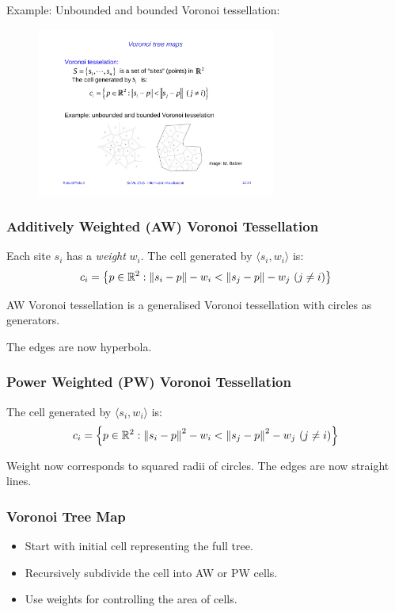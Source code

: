 Example: Unbounded and bounded Voronoi tessellation:
\begin{figure}[H]
\centering
\includegraphics[width=0.7\textwidth]{img/12_voronoi_tessellation}
\end{figure}

\subsubsection{Additively Weighted (AW) Voronoi Tessellation}
Each site $s_i$ has a \emph{weight} $w_i$. The cell generated by $\langle s_i, w_i\rangle$ is:
\begin{align*}
    c_i = \left\{
        p\in \mathbb{R}^2: \left\lVert s_i-p\right\rVert-w_i < \left\lVert s_j-p\right\rVert-w_j\ (j\neq i)
    \right\}
\end{align*}

AW Voronoi tessellation is a generalised  Voronoi tessellation with circles as generators.

The edges are now hyperbola.

\subsubsection{Power Weighted (PW) Voronoi Tessellation}

The cell generated by $\langle s_i, w_i\rangle$ is:
\begin{align*}
    c_i = \left\{
        p\in \mathbb{R}^2: \left\lVert s_i-p\right\rVert^2-w_i < \left\lVert s_j-p\right\rVert^2-w_j\ (j\neq i)
    \right\}
\end{align*}

Weight now corresponds to squared radii of circles. The edges are now straight lines.



\subsubsection{Voronoi Tree Map}
\begin{itemize}
\item Start with initial cell representing the full tree.
\item Recursively subdivide the cell into AW or PW cells.
\item Use weights for controlling the area of cells.
\end{itemize}

